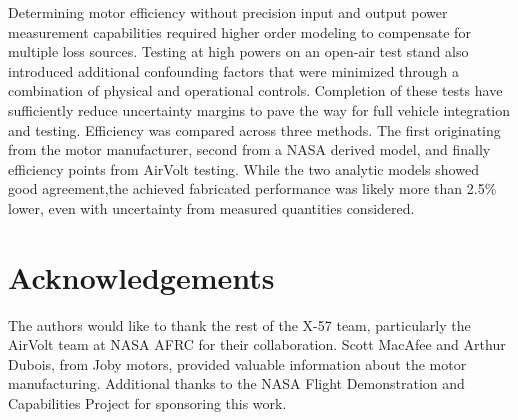 \documentclass[]{aiaa-tc}%
\begin{document}
Determining motor efficiency without precision input and output power measurement capabilities required higher order modeling to compensate for multiple loss sources. 
Testing at high powers on an open-air test stand also introduced additional confounding factors that were minimized through a combination of physical and operational controls.
Completion of these tests have sufficiently reduce uncertainty margins to pave the way for full vehicle integration and testing. Efficiency was compared across three methods. The first originating from the motor manufacturer, second from a NASA derived model, and finally efficiency points from AirVolt testing. While the two analytic models showed good agreement,the achieved fabricated performance was likely more than 2.5\% lower, even with uncertainty from measured quantities considered.


\section{Acknowledgements}

The authors would like to thank the rest of the X-57 team, particularly the AirVolt team at NASA AFRC for their collaboration. Scott MacAfee and Arthur Dubois, from Joby motors, provided valuable information about the motor manufacturing. Additional thanks to the NASA Flight Demonstration and Capabilities Project for sponsoring this work.




\end{document}
